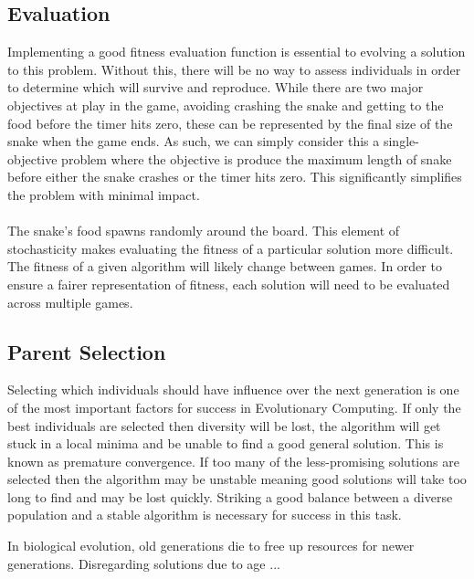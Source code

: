 \documentclass{article}
\begin{document}
\subsection{Evaluation}
Implementing a good fitness evaluation function is essential to evolving a solution to this problem. Without this, there will be no way to assess individuals in order to determine which will survive and reproduce. While there are two major objectives at play in the game, avoiding crashing the snake and getting to the food before the timer hits zero, these can be represented by the final size of the snake when the game ends. As such, we can simply consider this a single-objective problem where the objective is produce the maximum length of snake before either the snake crashes or the timer hits zero. This significantly simplifies the problem with minimal impact.
\\\\
The snake's food spawns randomly around the board. This element of stochasticity makes evaluating the fitness of a particular solution more difficult. The fitness of a given algorithm will likely change between games. In order to ensure a fairer representation of fitness, each solution will need to be evaluated across multiple games.

\subsection{Parent Selection}
Selecting which individuals should have influence over the next generation is one of the most important factors for success in Evolutionary Computing. If only the best individuals are selected then diversity will be lost, the algorithm will get stuck in a local minima and be unable to find a good general solution. This is known as premature convergence. If too many of the less-promising solutions are selected then the algorithm may be unstable meaning good solutions will take too long to find and may be lost quickly. Striking a good balance between a diverse population and a stable algorithm is necessary for success in this task.

In biological evolution, old generations die to free up resources for newer generations.
Disregarding solutions due to age ... %
\end{document}

